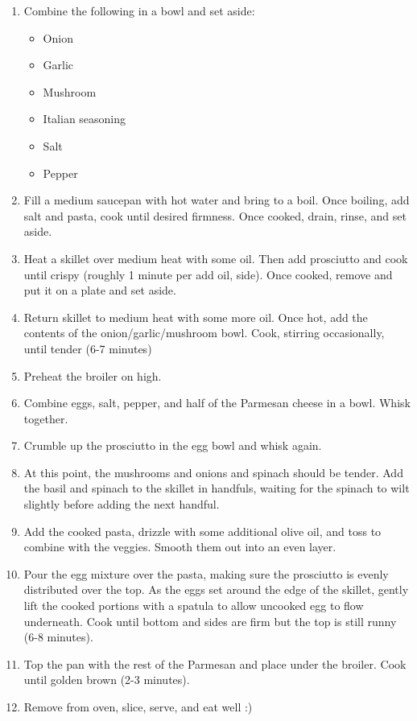\begin{enumerate}
\item Combine the following in a bowl and set aside:
\begin{itemize}
    \item Onion
    \item Garlic
    \item Mushroom
    \item Italian seasoning
    \item Salt
    \item Pepper
\end{itemize}
\item Fill a medium saucepan with hot water and bring to a boil. Once boiling, add salt and pasta, cook until desired
    firmness. Once cooked, drain, rinse, and set aside.
\item Heat a skillet over medium heat with some oil. Then add prosciutto and cook until crispy (roughly 1 minute per add
    oil, side). Once cooked, remove and put it on a plate and set aside.
\item Return skillet to medium heat with some more oil. Once hot, add the contents of the onion/garlic/mushroom bowl.
    Cook, stirring occasionally, until tender (6-7 minutes)
\item Preheat the broiler on high.
\item Combine eggs, salt, pepper, and half of the Parmesan cheese in a bowl. Whisk together.
\item Crumble up the prosciutto in the egg bowl and whisk again.
\item At this point, the mushrooms and onions and spinach should be tender. Add the basil and spinach to the skillet in
    handfuls, waiting for the spinach to wilt slightly before adding the next handful.
\item Add the cooked pasta, drizzle with some additional olive oil, and toss to combine with the veggies.  Smooth them out into an even layer.
\item Pour the egg mixture over the pasta, making sure the prosciutto is evenly distributed over the top.  As the eggs
    set around the edge of the skillet, gently lift the cooked portions with a spatula to allow uncooked egg to flow
    underneath. Cook until bottom and sides are firm but the top is still runny (6-8 minutes).
\item Top the pan with the rest of the Parmesan and place under the broiler. Cook until golden brown (2-3 minutes).
\item Remove from oven, slice, serve, and eat well :)
\end{enumerate}
